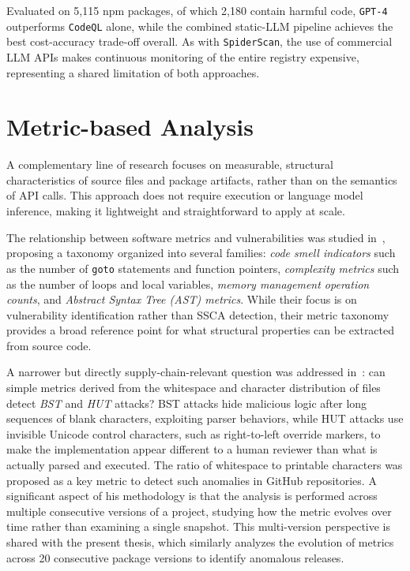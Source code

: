 Evaluated on 5,115 \ac{npm} packages, of which 2,180 contain harmful code, 
\texttt{GPT-4} outperforms \texttt{CodeQL} alone, 
while the combined static-\ac{LLM} pipeline achieves the best cost-accuracy trade-off overall.
As with \texttt{SpiderScan}, the use of commercial \ac{LLM} \acp{API} makes continuous monitoring of the entire registry expensive,
representing a shared limitation of both approaches.

\section{Metric-based Analysis}
\label{sec:metricBasedAnalysis}

A complementary line of research focuses on measurable, structural characteristics of 
source files and package artifacts, rather than on the semantics of \ac{API} calls.
This approach does not require execution or language model inference,
making it lightweight and straightforward to apply at scale.

The relationship between software metrics and vulnerabilities was studied in~\cite{weissberg2025llm}, 
proposing a taxonomy organized into several families: 
\emph{code smell indicators} such as the number of \texttt{goto} statements and function pointers, 
\emph{complexity metrics} such as the number of loops and local variables,
\emph{memory management operation counts}, and \emph{Abstract Syntax Tree (AST) metrics}. 
While their focus is on vulnerability identification rather than \ac{SSCA} detection, 
their metric taxonomy provides a broad reference point for what structural properties can be extracted from source code.

A narrower but directly supply-chain-relevant question was addressed in~\cite{zoratti2025valutazione}: 
can simple metrics derived from the whitespace and character distribution of files detect \emph{\ac{BST}} and \emph{\ac{HUT}} attacks?
\ac{BST} attacks hide malicious logic after long sequences of blank characters, exploiting parser behaviors,
while \ac{HUT} attacks use invisible Unicode control characters, such as right-to-left override markers,
to make the implementation appear different to a human reviewer than what is actually parsed and executed. 
The ratio of whitespace to printable characters was proposed as a key metric to detect such anomalies in GitHub repositories.
A significant aspect of his methodology is that the analysis is performed across multiple consecutive versions of a project,
studying how the metric evolves over time rather than examining a single snapshot. 
This multi-version perspective is shared with the present thesis, 
which similarly analyzes the evolution of metrics across 20 consecutive package versions to identify anomalous releases.


